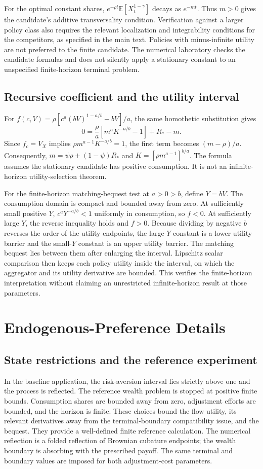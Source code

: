 \documentclass[ecta,nameyear,draft]{econsocart}
\theoremstyle{definition}
\theoremstyle{remark}
\newcommand{\E}{\mathbb E}
\begin{document}
For the optimal constant shares, $e^{-\rho t}\E[X_t^{1-\gamma}]$ decays as $e^{-m t}$. Thus $m>0$ gives the candidate's additive transversality condition. Verification against a larger policy class also requires the relevant localization and integrability conditions for the competitors, as specified in the main text. Policies with minus-infinite utility are not preferred to the finite candidate. The numerical laboratory checks the candidate formulas and does not silently apply a stationary constant to an unspecified finite-horizon terminal problem.

\subsection{Recursive coefficient and the utility interval}
For $f(c,V)=\rho[c^a(bV)^{1-a/b}-bV]/a$, the same homothetic substitution gives
\[
 0=\frac\rho a[m^aK^{-a/b}-1]+R_*-m.
\]
Since $f_c=V_X$ implies $\rho m^{a-1}K^{-a/b}=1$, the first term becomes $(m-\rho)/a$. Consequently, $m=\psi\rho+(1-\psi)R_*$ and $K=[\rho m^{a-1}]^{b/a}$. The formula assumes the stationary candidate has positive consumption. It is not an infinite-horizon utility-selection theorem.

For the finite-horizon matching-bequest test at $a>0>b$, define $Y=bV$. The consumption domain is compact and bounded away from zero. At sufficiently small positive $Y$, $c^aY^{-a/b}<1$ uniformly in consumption, so $f<0$. At sufficiently large $Y$, the reverse inequality holds and $f>0$. Because dividing by negative $b$ reverses the order of the utility endpoints, the large-$Y$ constant is a lower utility barrier and the small-$Y$ constant is an upper utility barrier. The matching bequest lies between them after enlarging the interval. Lipschitz scalar comparison then keeps each policy utility inside the interval, on which the aggregator and its utility derivative are bounded. This verifies the finite-horizon interpretation without claiming an unrestricted infinite-horizon result at those parameters.

\section{Endogenous-Preference Details}
\subsection{State restrictions and the reference experiment}
In the baseline application, the risk-aversion interval lies strictly above one and the process is reflected. The reference wealth problem is stopped at positive finite bounds. Consumption shares are bounded away from zero, adjustment efforts are bounded, and the horizon is finite. These choices bound the flow utility, its relevant derivatives away from the terminal-boundary compatibility issue, and the bequest. They provide a well-defined finite reference calculation. The numerical reflection is a folded reflection of Brownian cubature endpoints; the wealth boundary is absorbing with the prescribed payoff. The same terminal and boundary values are imposed for both adjustment-cost parameters.
\end{document}
